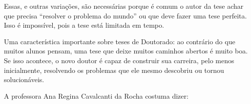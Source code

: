 Essas, e outras variações, são necessárias porque é comum o autor da tese achar que precisa ``resolver o problema do mundo'' ou que deve fazer uma tese perfeita. Isso é impossível, pois a tese está limitada em tempo.

Uma característica importante sobre teses de Doutorado: ao contrário do que muitos alunos pensam, uma tese que deixe muitos caminhos abertos é muito boa. Se isso acontece, o novo doutor é capaz de construir sua carreira, pelo menos inicialmente, resolvendo os problemas que ele mesmo descobriu ou tornou solucionáveis.

A professora Ana Regina Cavalcanti da Rocha costuma dizer:




